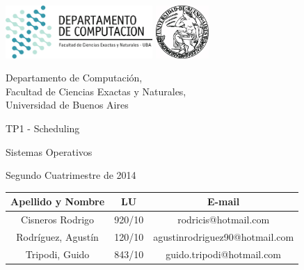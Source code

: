 \documentclass[a4paper,10pt,twoside]{article}
\begin{document}


\thispagestyle{caratula}

\begin{center}

\includegraphics[height=2cm]{DC.png} 
\hfill
\includegraphics[height=2cm]{UBA.jpg} 

\vspace{2cm}

Departamento de Computación,\\
Facultad de Ciencias Exactas y Naturales,\\
Universidad de Buenos Aires

\vspace{4cm}

\begin{Huge}
TP1 - Scheduling
\end{Huge}

\vspace{0.5cm}

\begin{Large}
Sistemas Operativos
\end{Large}

\vspace{1cm}

Segundo Cuatrimestre de 2014

\vspace{4cm}

\vspace{0.5cm}

\begin{tabular}{|c|c|c|}
\hline
Apellido y Nombre & LU & E-mail\\
\hline
Cisneros Rodrigo		& 920/10 & rodricis@hotmail.com\\
Rodr\'iguez, Agust\'in	& 120/10 & agustinrodriguez90@hotmail.com\\
Tripodi, Guido			& 843/10 & guido.tripodi@hotmail.com\\
\hline
\end{tabular}

\end{center}
\end{document}
